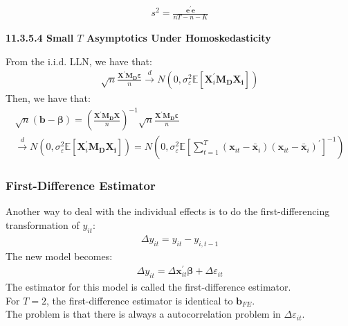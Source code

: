\documentclass{article}
\begin{document}
	\begin{align*}
		s^2 = \frac{\boldsymbol{e}^\prime \boldsymbol{e}}{nT - n - K}
	\end{align*}
\centerline{\textbf{11.3.5.4 Small $T$ Asymptotics Under Homoskedasticity}}
From the i.i.d. LLN, we have that:
	\begin{align*}
		\sqrt{n} \frac{\boldsymbol{X}^\prime \boldsymbol{M_D} \boldsymbol{\varepsilon}}{n} \xrightarrow{d} N(0, \sigma^2_\varepsilon \mathbb{E} [\boldsymbol{X}^\prime_i \boldsymbol{M_D} \boldsymbol{X_i}] )
	\end{align*}
Then, we have that:
	\begin{align*}
		\sqrt{n} (\boldsymbol{b} - \boldsymbol{\beta}) = (\frac{\boldsymbol{X}^\prime \boldsymbol{M_D} \boldsymbol{X}}{n})^{-1} \sqrt{n} \frac{\boldsymbol{X}^\prime \boldsymbol{M_D} \boldsymbol{\varepsilon}}{n}\\
		\xrightarrow{d} N(0, \sigma^2_{\varepsilon} \mathbb{E} [\boldsymbol{X}^\prime_i \boldsymbol{M_D} \boldsymbol{X_i}]) = N(0, \sigma^2_{\varepsilon} \mathbb{E} [\sum^T_{t=1} (\boldsymbol{x}_{it} - \bar{\boldsymbol{x}}_i) (\boldsymbol{x}_{it} - \bar{\boldsymbol{x}}_i)^\prime]^{-1} )
	\end{align*}

\subsubsection{First-Difference Estimator}
Another way to deal with the individual effects is to do the first-differencing transformation of $y_{it}$:
	\begin{align*}
		\Delta y_{it} = y_{it} - y_{i,t-1}
	\end{align*}
The new model becomes:
	\begin{align*}
		\Delta y_{it} = \Delta \boldsymbol{x}^\prime_{it} \boldsymbol{\beta} + \Delta \varepsilon_{it}
	\end{align*}
The estimator for this model is called the first-difference estimator.\\
For $T = 2$, the first-difference estimator is identical to $\boldsymbol{b}_{FE}$.\\
The problem is that there is always a autocorrelation problem in $\Delta \varepsilon_{it}$.
\end{document}
